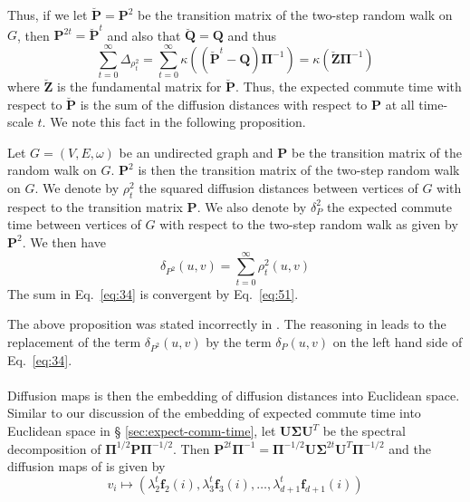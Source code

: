 Thus, if we let $\breve{\mathbf{P}} = \mathbf{P}^{2}$ be the transition matrix
of the two-step random walk on $G$, then $\mathbf{P}^{2t} =
\breve{\mathbf{P}}^{t}$ and also that $\breve{\mathbf{Q}} = \mathbf{Q}$ and thus
\begin{equation}
  \label{eq:51}
  \sum_{t = 0}^{\infty} \Delta_{\rho_{t}^{2}} = \sum_{t = 0}^{\infty}
  \kappa((\breve{\mathbf{P}}^{t} - \mathbf{Q})\bm{\Pi}^{-1}) =
  \kappa(\breve{\mathbf{Z}} \bm{\Pi}^{-1})
\end{equation}
where $\breve{\mathbf{Z}}$ is the fundamental matrix for
$\breve{\mathbf{P}}$. Thus, the expected commute time with respect to
$\breve{\mathbf{P}}$ is the
sum of the diffusion distances with respect to $\mathbf{P}$ at all
time-scale $t$. We note this fact in the following proposition.
\begin{proposition}
  \label{prop:17}
  Let $G = (V,E,\omega)$ be an undirected graph and $\mathbf{P}$ be
  the transition matrix of the random walk on $G$. $\mathbf{P}^{2}$ is
  then the transition matrix of the two-step random
  walk on $G$. We denote by $\rho_{t}^{2}$ the squared diffusion
  distances between vertices of $G$ with respect to the transition
  matrix $\mathbf{P}$. We also denote by $\delta_P^{2}$ the expected commute time
  between vertices of $G$ with respect to the two-step random walk as
  given by $\mathbf{P}^{2}$. We then have
  \begin{equation}
    \label{eq:34}
    \delta_{P^{2}}(u,v) = \sum_{t = 0}^{\infty}{\rho_{t}^{2}(u,v)}
  \end{equation}
  The sum in Eq.~\eqref{eq:34} is convergent by Eq.~\eqref{eq:51}.
\end{proposition}
The above proposition was stated incorrectly in 
\citep{qui07:_clust}. The reasoning in
\citep{qui07:_clust} leads to the replacement of the term
$\delta_{P^2}(u,v)$ by the term $\delta_{P}(u,v)$ on the left hand
side of Eq.~\eqref{eq:34}. \\ \\
%
%
\noindent
Diffusion maps is then the embedding of diffusion distances into
Euclidean space. Similar to our discussion of the embedding of
expected commute time into Euclidean space in \S
\ref{sec:expect-comm-time}, let $\mathbf{U}\bm{\Sigma}\mathbf{U}^{T}$ be the
spectral decomposition of
$\bm{\Pi}^{1/2}\mathbf{P}\bm{\Pi}^{-1/2}$. Then
$\mathbf{P}^{2t}\bm{\Pi}^{-1} =
\bm{\Pi}^{-1/2}\mathbf{U}\bm{\Sigma}^{2t}\mathbf{U}^{T}\bm{\Pi}^{-1/2}$ and
the diffusion maps of \citet{coifman06:_diffus_maps}
is given by 
\begin{equation}
  \label{eq:106}
  v_i \mapsto (\lambda_{2}^{t} \mathbf{f}_{2}(i), \lambda_{3}^{t}
  \mathbf{f}_{3}(i), \dots, \lambda_{d+1}^{t} \mathbf{f}_{d+1}(i))
\end{equation}
